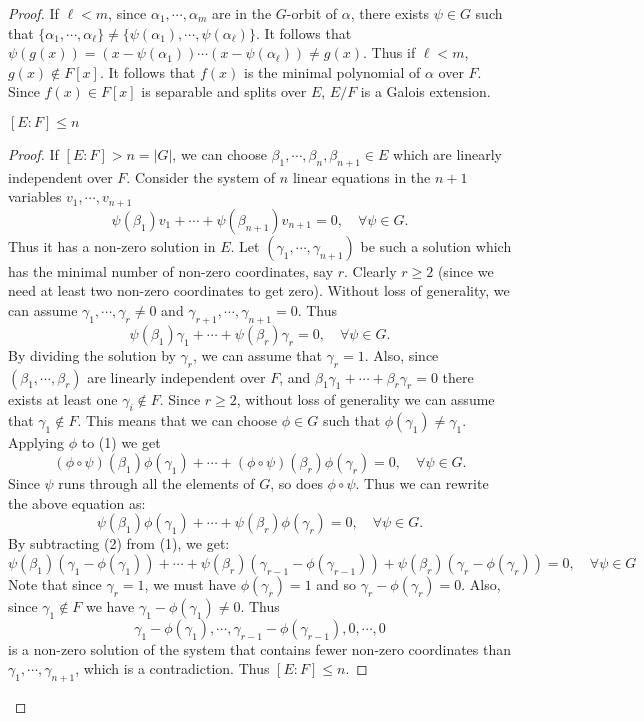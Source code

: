 \documentclass[11pt]{article}
\begin{document}
\begin{proof}
    If $\ell<m$, since $\alpha_1,\cdots,\alpha_m$ are in the $G$-orbit of $\alpha$, there exists $\psi\in G$ such that $\{\alpha_1,\cdots,\alpha_\ell\}\neq\{\psi(\alpha_1),\cdots,\psi(\alpha_\ell)\}$. It follows that $\psi(g(x))=(x-\psi(\alpha_1))\cdots(x-\psi(\alpha_\ell))\neq g(x)$. Thus if $\ell<m$, $g(x)\not\in F[x]$. It follows that $f(x)$ is the minimal polynomial of $\alpha$ over $F$. Since $f(x)\in F[x]$ is separable and splits over $E$, $E/F$ is a Galois extension.
    \begin{claim}
        $[E:F]\leq n$
    \end{claim}
    \begin{proof}
        If $[E:F]>n=|G|$, we can choose $\beta_1,\cdots,\beta_n,\beta_{n+1}\in E$ which are linearly independent over $F$. Consider the system of $n$ linear equations in the $n+1$ variables $v_1,\cdots,v_{n+1}$
        \[\psi(\beta_1)v_1+\cdots+\psi(\beta_{n+1})v_{n+1}=0,\quad\forall\psi\in G.\]
        Thus it has a non-zero solution in $E$. Let $(\gamma_1,\cdots,\gamma_{n+1})$ be such a solution which has the minimal number of non-zero coordinates, say $r$. Clearly $r\geq2$ (since we need at least two non-zero coordinates to get zero). Without loss of generality, we can assume $\gamma_1,\cdots,\gamma_r\neq0$ and $\gamma_{r+1},\cdots,\gamma_{n+1}=0$. Thus
        \[\psi(\beta_1)\gamma_1+\cdots+\psi(\beta_r)\gamma_r=0,\quad\forall\psi\in G.\tag{1}\]
        By dividing the solution by $\gamma_r$, we can assume that $\gamma_r=1$. Also, since $(\beta_1,\cdots,\beta_r)$ are linearly independent over $F$, and $\beta_1\gamma_1+\cdots+\beta_r\gamma_r=0$ there exists at least one $\gamma_i\not\in F$. Since $r\geq 2$, without loss of generality we can assume that $\gamma_1\not\in F$. This means that we can choose $\phi\in G$ such that $\phi(\gamma_1)\neq\gamma_1$. Applying $\phi$ to (1) we get
        \[(\phi\circ\psi)(\beta_1)\phi(\gamma_1)+\cdots+(\phi\circ\psi)(\beta_r)\phi(\gamma_r)=0,\quad\forall\psi\in G.\]
        Since $\psi$ runs through all the elements of $G$, so does $\phi\circ\psi$. Thus we can rewrite the above equation as:
        \[\psi(\beta_1)\phi(\gamma_1)+\cdots+\psi(\beta_r)\phi(\gamma_r)=0,\quad\forall\psi\in G.\tag{2}\]
        By subtracting (2) from (1), we get:
        \[\psi(\beta_1)(\gamma_1-\phi(\gamma_1))+\cdots+\psi(\beta_r)(\gamma_{r-1}-\phi(\gamma_{r-1}))+\psi(\beta_r)(\gamma_r-\phi(\gamma_r))=0,\quad\forall\psi\in G\]
        Note that since $\gamma_r=1$, we must have $\phi(\gamma_r)=1$ and so $\gamma_r-\phi(\gamma_r)=0$. Also, since $\gamma_1\not\in F$ we have $\gamma_1-\phi(\gamma_1)\neq0$. Thus
        \[\gamma_1-\phi(\gamma_1),\cdots,\gamma_{r-1}-\phi(\gamma_{r-1}),0,\cdots,0\]
        is a non-zero solution of the system that contains fewer non-zero coordinates than $\gamma_1,\cdots,\gamma_{n+1}$, which is a contradiction. Thus $[E:F]\leq n$.
        

\end{proof}
\end{proof}
\end{document}
